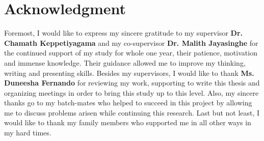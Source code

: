 \chapter*{Acknowledgment}


Foremost, I would like to express my sincere gratitude to my supervisor \textbf{Dr.
Chamath Keppetiyagama} and my co-supervisor \textbf{Dr. Malith Jayasinghe} for
the continued support of my study for whole one year, their patience, motivation and
immense knowledge. Their guidance allowed me to improve my thinking, writing
and presenting skills.
Besides my supervisors, I would like to thank \textbf{Ms. Duneesha Fernando} for
reviewing my work, supporting to write this thesis and organizing meetings in order
to bring this study up to this level.
Also, my sincere thanks go to my batch-mates who helped to succeed in this
project by allowing me to discuss problems arisen while continuing this research.
Last but not least, I would like to thank my family members who supported
me in all other ways in my hard times.
